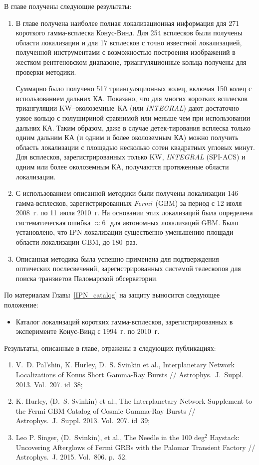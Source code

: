 \FloatBarrier

В главе получены следующие результаты:
\begin{enumerate}
\item В главе получена наиболее полная локализационная информация для 271 короткого 
гамма-всплеска Конус-Винд. Для 254 всплесков были получены области локализации и 
для 17 всплесков с точно известной локализацией, полученной инструментами с 
возможностью построения изображений в жестком рентгеновском диапазоне, триангуляционные
кольца получены для проверки методики.

Суммарно было получено 517 триангуляционных колец, включая 150 колец с использованием 
дальних КА. Показано, что для многих коротких всплесков триангуляции 
KW--околоземные~КА (или \textit{INTEGRAL}) дают достаточно узкое кольцо 
с полушириной сравнимой или меньше чем при использовании дальних КА. Таким образом, 
даже в случае детек-тирования всплеска только одним дальним КА (и одним и более 
околоземным КА) можно получить область локализации с площадью несколько 
сотен квадратных угловых минут. Для всплесков, зарегистрированных только KW, 
\textit{INTEGRAL} (SPI-ACS) и одним или более околоземным КА, получаются 
протяженные области локализации.

\item С использованием описанной методики были получены локализации 146 гамма-всплесков,
зарегистрированных \textit{Fermi}~(GBM) за период с 12 июля 2008~г. по 11 июля 2010~г.
На основании этих локализаций была определена систематическая ошибка $\approx 6^\circ$
для автономных локализаций GBM. Было установлено, что IPN локализации 
существенно уменьшению площади области локализации GBM, до 180~раз.  

\item Описанная методика была успешно применена для подтверждения оптических послесвечений,
зарегистрированных системой телескопов для поиска транзиетов Паломарской обсерватории.
\end{enumerate}

По материалам Главы~\ref{IPN_catalog} на защиту выносится следующее положение:
\begin{itemize}
\item Каталог локализаций коротких гамма-всплесков, зарегистрированных в эксперименте
    Конус-Винд с 1994~г. по 2010~г.
\end{itemize}

Результаты, описанные в главе, отражены в следующих публикациях:
\begin{enumerate}
\item V.~D. Pal'shin, K. Hurley, D.~S. Svinkin et al., Interplanetary Network Localizations of
Konus Short Gamma-Ray Bursts // Astrophys.~J.~Suppl. 2013. Vol.~207. id~38;
\item K. Hurley, (D.~S. Svinkin) et al., The Interplanetary Network Supplement to 
the Fermi GBM Catalog of Cosmic Gamma-Ray Bursts // Astrophys.~J.~Suppl. 2013. Vol.~207. id~39;
\item Leo P. Singer, (D.~Svinkin), et al., The Needle in the 100 deg$^2$ Haystack: 
Uncovering Afterglows of Fermi GRBs with the Palomar Transient Factory // 
Astrophys.~J. 2015. Vol.~806. p.~52.
\end{enumerate}


\clearpage